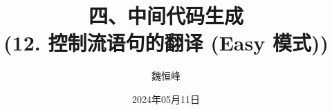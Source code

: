 \documentclass[]{beamer}
\title[中间代码生成]{四、中间代码生成 \\ (12. 控制流语句的翻译 (Easy 模式))}
\author[魏恒峰]{\large 魏恒峰}
\institute{hfwei@nju.edu.cn}
\date{2024年05月11日}
\begin{document}
\maketitle



\thankyou{}

\end{document}
